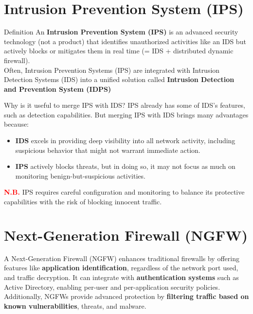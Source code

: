 \section{Intrusion Prevention System (IPS)}
\vspace{0.2cm}
\begin{quotebox-yellow}{Definition}
An \textbf{Intrusion Prevention System (IPS)} is an advanced security technology (not a product) that identifies unauthorized activities like an IDS but actively blocks or mitigates them in real time (= IDS + distributed dynamic firewall).\\ Often, Intrusion Prevention Systems (IPS) are integrated with Intrusion Detection Systems (IDS) into a unified solution called \textbf{Intrusion Detection and Prevention System (IDPS)}
\end{quotebox-yellow}
\begin{center}
\begin{quotebox-red}{Why is it useful to merge IPS with IDS?}
    IPS already has some of IDS's features, such as detection capabilities. But merging IPS with IDS brings many advantages because:
    \begin{itemize}
        \item \textbf{IDS} excels in providing deep visibility into all network activity, including suspicious behavior that might not warrant immediate action.
        \item \textbf{IPS} actively blocks threats, but in doing so, it may not focus as much on monitoring benign-but-suspicious activities.
    \end{itemize}
\end{quotebox-red}
\end{center}
\noindent
\textcolor{red}{\textbf{N.B.}} IPS requires careful configuration and monitoring to balance its protective capabilities with the risk of blocking innocent traffic.

\section{Next-Generation Firewall (NGFW)}
A Next-Generation Firewall (NGFW) enhances traditional firewalls by offering features like \textbf{application identification}, regardless of the network port used, and traffic decryption. It can integrate with \textbf{authentication systems} such as Active Directory, enabling per-user and per-application security policies. Additionally, NGFWs provide advanced protection by \textbf{filtering traffic based on known vulnerabilities}, threats, and malware.

